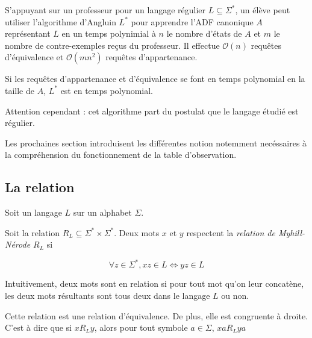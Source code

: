 \begin{theorem}
	S'appuyant sur un professeur pour un langage régulier $L\subseteq\Sigma^*$, un élève peut utiliser l'algorithme d'Angluin $L^*$ pour apprendre l'ADF canonique $A$ représentant $L$ en un temps polynimial à $n$ le nombre d'états de $A$ et $m$ le nombre de contre-exemples reçus du professeur.
	Il effectue $\mathcal{O}(n)$ requêtes d'équivalence et $\mathcal{O}(mn^2)$ requêtes d'appartenance.\cite{Angluin87}
\end{theorem}

\begin{corollary}
	Si les requêtes d'appartenance et d'équivalence se font en temps polynomial en la taille de $A$, $L^*$ est en temps polynomial.
\end{corollary}

Attention cependant : cet algorithme part du postulat que le langage étudié est régulier.

Les prochaines section introduisent les différentes notion notemment necéssaires à la compréhension du fonctionnement de la table d'observation.



\subsection{La relation \rl}

Soit un langage $L$ sur un alphabet $\Sigma$.

Soit la relation $R_L\subseteq\Sigma^*\times\Sigma^*$. Deux mots $x$ et $y$ respectent la \emph{relation de Myhill-Nérode $R_L$} si

$$\forall z \in \Sigma^*, xz \in L \Leftrightarrow yz \in L$$

Intuitivement, deux mots sont en relation si pour tout mot qu'on leur concatène, les deux mots résultants sont tous deux dans le langage $L$ ou non.

\begin{lemma}
	Cette relation est une relation d'équivalence. De plus, elle est congruente à droite. C'est à dire que si $xR_Ly$, alors pour tout symbole $a \in \Sigma$, $xaR_Lya$
\end{lemma}

